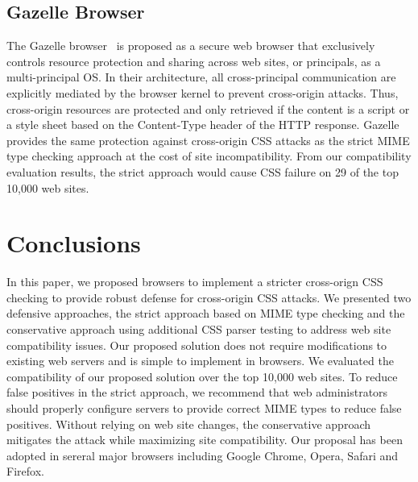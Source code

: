 \documentclass{acm_proc_article-sp}
\begin{document}
\subsection{Gazelle Browser}
The Gazelle browser~\cite{gazelle} is proposed as a secure web browser that exclusively controls resource protection and sharing across web sites, or principals, as a multi-principal OS. In their architecture, all cross-principal communication are explicitly mediated by the browser kernel to prevent cross-origin attacks. Thus, cross-origin resources are protected and only retrieved if the content is a script or a style sheet based on the Content-Type header of the HTTP response. Gazelle provides the same protection against cross-origin CSS attacks as the strict MIME type checking approach at the cost of site incompatibility. From our compatibility evaluation results, the strict approach would cause CSS failure on 29 of the top 10,000 web sites.

\section{Conclusions}
In this paper, we proposed browsers to implement a stricter cross-orign CSS checking to provide robust defense for cross-origin CSS attacks. We presented two defensive approaches, the strict approach based on MIME type checking and the conservative approach using additional CSS parser testing to address web site compatibility issues. Our proposed solution does not require modifications to existing web servers and is simple to implement in browsers. We evaluated the compatibility of our proposed solution over the top 10,000 web sites. To reduce false positives in the strict approach, we recommend that web administrators should properly configure servers to provide correct MIME types to reduce false positives. Without relying on web site changes, the conservative approach mitigates the attack while maximizing site compatibility. Our proposal has been adopted in sereral major browsers including Google Chrome, Opera, Safari and Firefox.



\end{document}
